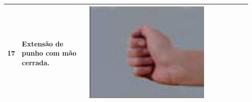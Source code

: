 \begin{table}[htb]
\begin{tabular}{m{0.5cm} m{1.5cm} m{2cm} | m{0.5cm} m{1.5cm} m{2cm} | m{0.5cm} m{1.5cm} m{2cm}}
		17	&	Extensão de punho com mão cerrada.	& \includegraphics[width=\linewidth]{./img/moves/mov17.png}\\
		\bottomrule
	\end{tabular}
\end{table}
